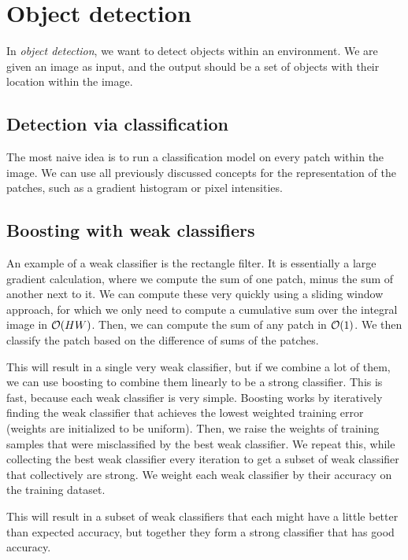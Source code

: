\section{Object detection}

In \textit{object detection}, we want to detect objects within an environment.
We are given an image as input, and the output should be a set of objects with
their location within the image.

\subsection{Detection via classification}

The most naive idea is to run a classification model on every patch within the
image. We can use all previously discussed concepts for the representation of
the patches, such as a gradient histogram or pixel intensities.

\subsection{Boosting with weak classifiers}

An example of a weak classifier is the rectangle filter. It is essentially a
large gradient calculation, where we compute the sum of one patch, minus the
sum of another next to it. We can compute these very quickly using a sliding
window approach, for which we only need to compute a cumulative sum over the
integral image in $\bigo{HW}$. Then, we can compute the sum of any patch in
$\bigo{1}$. We then classify the patch based on the difference of sums of the
patches.

This will result in a single very weak classifier, but if we combine a lot of
them, we can use boosting to combine them linearly to be a strong classifier.
This is fast, because each weak classifier is very simple. Boosting works by
iteratively finding the weak classifier that achieves the lowest weighted
training error (weights are initialized to be uniform). Then, we raise the
weights of training samples that were misclassified by the best weak
classifier. We repeat this, while collecting the best weak classifier every
iteration to get a subset of weak classifier that collectively are strong. We
weight each weak classifier by their accuracy on the training dataset.

This will result in a subset of weak classifiers that each might have a little
better than expected accuracy, but together they form a strong classifier that
has good accuracy.

